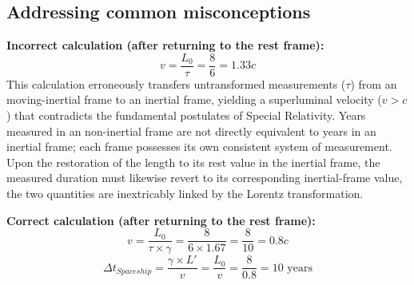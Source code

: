 \documentclass[a4paper,fleqn]{cas-sc}
\begin{document}
	\subsection{ Addressing common misconceptions}\label{subsec3_6}
		\textbf{Incorrect calculation (after returning to the rest frame):}
			\begin{equation*}
  				v = \frac{L_0}{\tau} = \frac{8}{6} = 1.33c 
			\end{equation*}
	This calculation erroneously transfers untransformed measurements ($\tau$) from an moving-inertial frame to an inertial frame, yielding a superluminal velocity ($v > c$) that contradicts the fundamental postulates of Special Relativity. Years measured in an non-inertial frame are not directly equivalent to years in an inertial frame; each frame possesses its own consistent system of measurement. Upon the restoration of the length to its rest value in the inertial frame, the measured duration must likewise revert to its corresponding inertial-frame value, the two quantities are inextricably linked by the Lorentz transformation.

		\textbf{Correct calculation (after returning to the rest frame):}
			\begin{equation*}
  				v = \frac{L_0}{\tau \times \gamma} = \frac{8}{6 \times 1.67} = \frac{8}{10} = 0.8c
			\end{equation*}
			\begin{equation*}
  				\Delta t_{Spaceship} = \frac{\gamma \times L'}{v} = \frac{L_0}{v}=\frac{8}{0.8} = 10 					\text{ years}
			\end{equation*}
\end{document}
